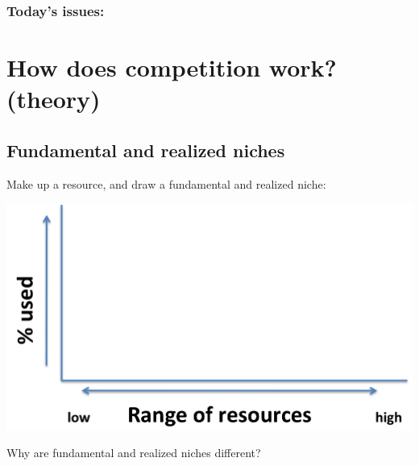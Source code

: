 \begin{noheadline}
\begin{frame}
\frametitle{Today's issues:}
\vspace{5mm}
\tableofcontents
\end{frame}
\end{noheadline}


\section[How does competition work?]{How does competition work? (theory)}

\subsection{Fundamental and realized niches}

\begin{frame}[t]
    \begin{adjustwidth}{-2em}{-1.5em}
        \vspace{-2mm}
        Make up a resource, and draw a fundamental and realized niche:

        \begin{center}
        \includegraphics[height=0.67\textheight]{draw-niche.png}
        \end{center}

        \vspace{-2mm}
        Why are fundamental and realized niches different?


    \end{adjustwidth}
\end{frame}

